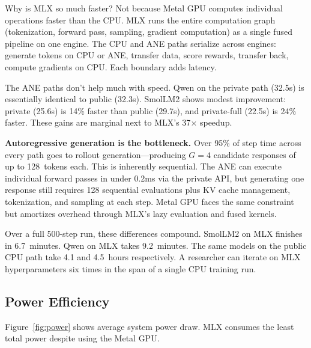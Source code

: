 \documentclass[11pt]{article}
\begin{document}
Why is MLX so much faster?  Not because Metal GPU computes individual operations faster than the CPU.  MLX runs the entire computation graph (tokenization, forward pass, sampling, gradient computation) as a single fused pipeline on one engine.  The CPU and ANE paths serialize across engines: generate tokens on CPU or ANE, transfer data, score rewards, transfer back, compute gradients on CPU.  Each boundary adds latency.

The ANE paths don't help much with speed.  Qwen on the private path (32.5s) is essentially identical to public (32.3s).  SmolLM2 shows modest improvement: private (25.6s) is 14\% faster than public (29.7s), and private-full (22.5s) is 24\% faster.  These gains are marginal next to MLX's 37$\times$ speedup.

\textbf{Autoregressive generation is the bottleneck.}  Over 95\% of step time across every path goes to rollout generation---producing $G=4$ candidate responses of up to 128~tokens each.  This is inherently sequential.  The ANE can execute individual forward passes in under 0.2ms via the private API, but generating one response still requires 128 sequential evaluations plus KV cache management, tokenization, and sampling at each step.  Metal GPU faces the same constraint but amortizes overhead through MLX's lazy evaluation and fused kernels.

Over a full 500-step run, these differences compound.  SmolLM2 on MLX finishes in 6.7~minutes.  Qwen on MLX takes 9.2~minutes.  The same models on the public CPU path take 4.1 and 4.5~hours respectively.  A researcher can iterate on MLX hyperparameters six times in the span of a single CPU training run.

\subsection{Power Efficiency}
\label{sec:power}

Figure~\ref{fig:power} shows average system power draw.  MLX consumes the least total power despite using the Metal GPU.
\end{document}
